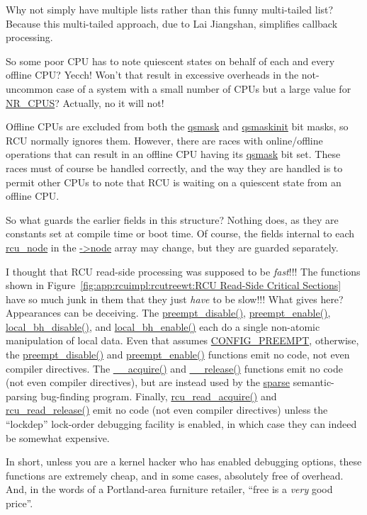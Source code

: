 \QuickQ{}
	Why not simply have multiple lists rather than this funny
	multi-tailed list?
\QuickA{}
	Because this multi-tailed approach, due to Lai Jiangshan,
	simplifies callback processing.

\QuickQ{}
	So some poor CPU has to note quiescent states on behalf of
	each and every offline CPU?
	Yecch!
	Won't that result in excessive overheads in the not-uncommon
	case of a system with a small number of CPUs but a large value
	for \url{NR_CPUS}?
\QuickA{}
	Actually, no it will not!

	Offline CPUs are excluded from both the \url{qsmask} and
	\url{qsmaskinit} bit masks, so RCU normally ignores them.
	However, there are races with online/offline operations that
	can result in an offline CPU having its \url{qsmask} bit set.
	These races must of course be handled correctly, and the way
	they are handled is to permit other CPUs to note that RCU
	is waiting on a quiescent state from an offline CPU.

\QuickQ{}
	So what guards the earlier fields in this structure?
\QuickA{}
	Nothing does, as they are constants set at compile time
	or boot time.
	Of course, the fields internal to each \url{rcu_node}
	in the \url{->node} array may change, but they are
	guarded separately.

\QuickQ{}
	I thought that RCU read-side processing was supposed to
	be \emph{fast}!!!
	The functions shown in
	Figure~\ref{fig:app:rcuimpl:rcutreewt:RCU Read-Side Critical Sections}
	have so much junk in them that they just \emph{have} to be slow!!!
	What gives here?
\QuickA{}
	Appearances can be deceiving.
	The \url{preempt_disable()}, \url{preempt_enable()},
	\url{local_bh_disable()}, and \url{local_bh_enable()} each
	do a single non-atomic manipulation of local data.
	Even that assumes \url{CONFIG_PREEMPT}, otherwise,
	the \url{preempt_disable()} and \url{preempt_enable()}
	functions emit no code, not even compiler directives.
	The \url{__acquire()} and \url{__release()} functions
	emit no code (not even compiler directives), but are instead
	used by the \url{sparse} semantic-parsing bug-finding program.
	Finally, \url{rcu_read_acquire()} and \url{rcu_read_release()}
	emit no code (not even compiler directives) unless the
	``lockdep'' lock-order debugging facility is enabled, in
	which case they can indeed be somewhat expensive.

	In short, unless you are a kernel hacker who has enabled
	debugging options, these functions are extremely cheap,
	and in some cases, absolutely free of overhead.
	And, in the words of a Portland-area furniture retailer,
	``free is a \emph{very} good price''.

